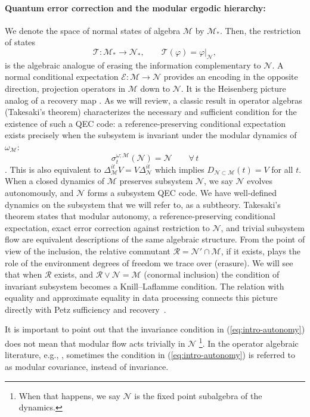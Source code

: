 \documentclass[a4paper,11pt]{article}
\theoremstyle{definition}
\newcommand{\mR}{\mathcal{R}}
\newcommand{\mN}{\mathcal{N}}
\newcommand{\mM}{\mathcal{M}}
\newcommand{\mE}{\mathcal{E}}
\begin{document}
\paragraph{Quantum error correction and the modular ergodic hierarchy:} We denote the space of normal states of algebra $\mM$ by $\mM_*$. Then, the restriction of states
\begin{equation}
    \mathcal T:\mM_*\to\mN_*,
    \qquad
    \mathcal T(\varphi)=\varphi|_{\mN},
\end{equation}
is the algebraic analogue of erasing the information complementary to $\mN$.  A normal conditional expectation $\mE:\mM\to\mN$ provides an encoding in the opposite direction, projection operators in $\mM$ down to $\mN$. It is the Heisenberg picture analog of a recovery map \cite{furuya2022real,Faulkner2020}. As we will review, a classic result in operator algebras (Takesaki's theorem) characterizes the necessary and sufficient condition for the existence of such a QEC code: a reference-preserving conditional expectation exists precisely when the subsystem is invariant under the modular dynamics of $\omega_{\mM}$:
\begin{equation}
    \sigma_t^{\omega;\mM}(\mN)=\mN
    \qquad\forall\,t
    \label{eq:intro-autonomy}
\end{equation}
\cite{Takesaki1972,Faulkner2020,furuya2022real}.  This is also equivalent to
$\Delta_{\mM}^{it}V=V\Delta_{\mN}^{it}$ which implies $D_{\mN\subset\mM}(t)=V$ for all $t$.  When a closed dynamics of $\mM$ preserves subsystem $\mN$, we say $\mN$ evolves autonomously, and $\mN$ forms a subsystem QEC code. We have well-defined dynamics on the subsystem that we will refer to, as a subtheory. Takesaki's theorem states that modular autonomy, a reference-preserving conditional expectation, exact error correction against restriction to $\mN$, and trivial subsystem flow are equivalent descriptions of the same algebraic structure.  From the point of view of the inclusion, the relative commutant $\mR=\mN'\cap \mM$, if it exists, plays the role of the environment degrees of freedom we trace over (erasure). We will see that when $\mR$ exists, and $\mR\vee \mN=\mM$ (conormal inclusion) the condition of invariant subsystem becomes a Knill--Laflamme condition.  The relation with equality and approximate equality in data processing connects this picture directly with Petz sufficiency and recovery~\cite{Petz1986,Petz1988,JungeRennerSutterWildeWinter2018,FaulknerHollandsSwingleWang2022}.

It is important to point out that the invariance condition in (\ref{eq:intro-autonomy}) does not mean that modular flow acts trivially in $\mN$ \footnote{When that happens, we say $\mN$ is the fixed point subalgebra of the dynamics.}. In the operator algebraic literature, e.g., \cite{revolutionizing}, sometimes the condition in (\ref{eq:intro-autonomy}) is referred to as modular covariance, instead of invariance. 
\end{document}
